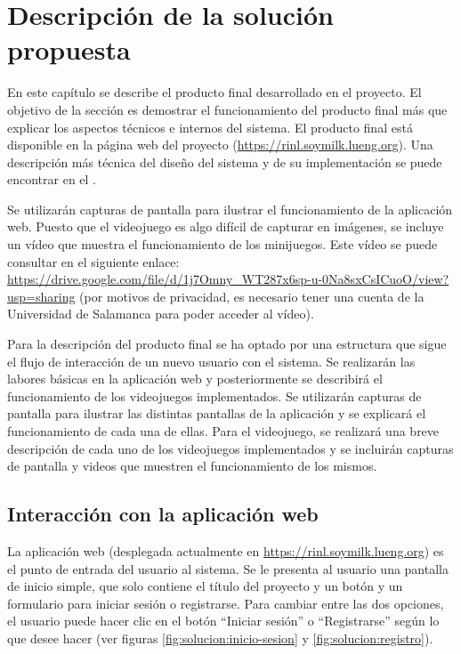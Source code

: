 \chapter{Descripción de la solución propuesta}
\label{cap:solucion}
En este capítulo se describe el producto final desarrollado en el proyecto. El objetivo de la
sección es demostrar el funcionamiento del producto final más que explicar los aspectos técnicos
e internos del sistema. El producto final está disponible en la página web del proyecto
(\url{https://rinl.soymilk.lueng.org}). Una descripción más técnica del diseño del sistema y de
su implementación se puede encontrar en el \segundoAnexo.

Se utilizarán capturas de pantalla para ilustrar el funcionamiento de la
aplicación web. Puesto que el videojuego es algo difícil de capturar en
imágenes, se incluye un vídeo que muestra el funcionamiento de los minijuegos.
Este vídeo se puede consultar en el siguiente enlace:
\url{https://drive.google.com/file/d/1j7Omny_WT287x6sp-u-0Na8sxCsICuoO/view?usp=sharing}
(por motivos de privacidad, es necesario tener una cuenta de la Universidad de
Salamanca para poder acceder al vídeo).

Para la descripción del producto final se ha optado por una estructura que sigue el flujo de
interacción de un nuevo usuario con el sistema. Se realizarán las labores básicas en la aplicación
web y posteriormente se describirá el funcionamiento de los videojuegos implementados. Se
utilizarán capturas de pantalla para ilustrar las distintas pantallas de la aplicación y se
explicará el funcionamiento de cada una de ellas. Para el videojuego, se realizará una breve
descripción de cada uno de los videojuegos implementados y se incluirán capturas de pantalla
y videos que muestren el funcionamiento de los mismos.

\section{Interacción con la aplicación web}
\label{sec:interaccion-web}
La aplicación web (desplegada actualmente en \url{https://rinl.soymilk.lueng.org}) es el punto de
entrada del usuario al sistema. Se le presenta al usuario una pantalla de inicio simple, que solo
contiene el título del proyecto y un botón y un formulario para iniciar sesión o registrarse. Para
cambiar entre las dos opciones, el usuario puede hacer clic en el botón \enquote{Iniciar sesión}
o \enquote{Registrarse} según lo que desee hacer (ver figuras \ref{fig:solucion:inicio-sesion} y
\ref{fig:solucion:registro}).

